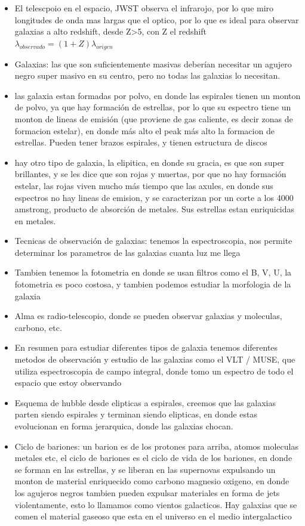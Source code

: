 \documentclass[
  11pt,
  letterpaper,
  answers
]{exam}
\begin{document}
\begin{itemize}
    \item El  telescpoio en el espacio, JWST observa el infrarojo, por lo que miro longitudes de onda mas largas que el optico, por lo que es ideal para observar galaxias a alto redshift, desde Z>5, con Z el redshift $\lambda_{observado} = (1+Z)\lambda_{origen}$
    \item Galaxias: las que son suficientemente masivas deberían necesitar un agujero negro super masivo en su centro, pero no todas las galaxias lo necesitan.
    \item las galaxia estan formadas por polvo, en donde las espirales tienen un monton de polvo, ya que hay formación de estrellas, por lo que su espectro tiene un monton de lineas de emisión (que proviene de gas caliente, es decir zonas de formacion estelar), en donde más alto el peak más alto la formacion de estrellas. Pueden tener brazos espirales, y tienen estructura de discos
    \item hay otro tipo de galaxia, la elipitica, en donde su gracia, es que son super brillantes, y se les dice que son rojas y muertas, por que no hay formación estelar, las rojas viven mucho más tiempo que las axules, en donde sus espectros no hay lineas de emision, y se caracterizan por un corte a los 4000 amstrong, producto de absorción de metales. Sus estrellas estan enriquicidas en metales.
    \item Tecnicas de observación de galaxias: tenemos la espectroscopia, nos permite determinar los parametros de las galaxias cuanta luz me llega
    \item Tambien tenemos la fotometria en donde se usan filtros como el B, V, U, la fotometria es poco costosa, y tambien podemos estudiar la morfologia de la galaxia 
    \item Alma es radio-telescopio, donde se pueden observar galaxias y moleculas, carbono, etc.
    \item En resumen para estudiar diferentes tipos de galaxia tenemos diferentes metodos de observación y estudio de las galaxias como el VLT / MUSE, que utiliza espectroscopia de campo integral, donde tomo un espectro de todo el espacio que estoy observando
    \item Esquema de hubble desde elipticas a espirales, creemos que las galaxias parten siendo espirales y terminan siendo elipticas, en donde estas evolucionan en forma jerarquica, donde las galaxias chocan.
    \item Ciclo de bariones: un barion es de los protones para arriba, atomos moleculas metales etc, el ciclo de bariones es el ciclo de vida de los bariones, en donde se forman en las estrellas, y se liberan en las supernovas expulsando un monton de material enriquecido como carbono magnesio oxigeno, en donde los agujeros negros tambien pueden expulsar materiales en forma de jets violentamente, esto lo llamamos como vientos galacticos. Hay galaxias que se comen el material gaseoso que esta en el universo en el medio intergalactico

\end{itemize}
\end{document}
